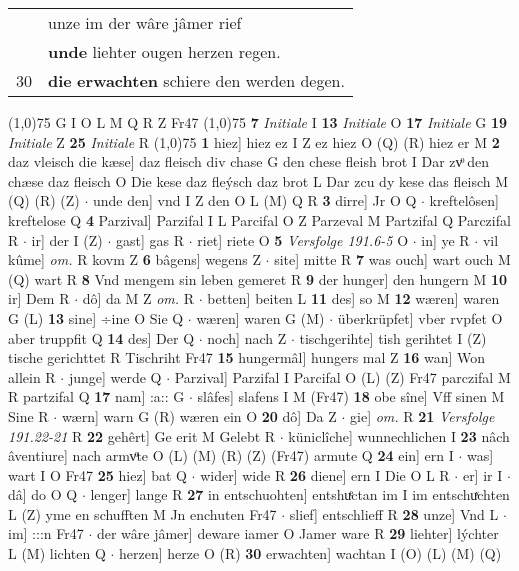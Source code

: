 \documentclass[8pt,a4paper,notitlepage]{article}
\begin{document}
\begin{table}[ht]
\begin{minipage}[t]{0.5\linewidth}
\begin{tabular}{rl}
 & unze im der wâre jâmer rief\\ 
 & \textbf{unde} liehter ougen herzen regen.\\ 
30 & \textbf{die} \textbf{erwachten} schiere den werden degen.\\ 
\end{tabular}
\scriptsize
\line(1,0){75} \newline
G I O L M Q R Z Fr47 \newline
\line(1,0){75} \newline
\textbf{7} \textit{Initiale} I  \textbf{13} \textit{Initiale} O  \textbf{17} \textit{Initiale} G  \textbf{19} \textit{Initiale} Z  \textbf{25} \textit{Initiale} R  \newline
\line(1,0){75} \newline
\textbf{1} hiez] hiez ez I Z ez hiez O (Q) (R) hiez er M \textbf{2} daz vleisch die kæse] daz fleisch div chase G den chese fleish brot I Dar zvͦ den chæse daz fleisch O Die kese daz fleýsch daz brot L Dar zcu dy kese das fleisch M (Q) (R) (Z)  $\cdot$ unde den] vnd I Z den O L (M) Q R \textbf{3} dirre] Jr O Q  $\cdot$ kreftelôsen] kreftelose Q \textbf{4} Parzival] Parzifal I L Parcifal O Z Parzeval M Partzifal Q Parczifal R  $\cdot$ ir] der I (Z)  $\cdot$ gast] gas R  $\cdot$ riet] riete O \textbf{5} \textit{Versfolge 191.6-5} O   $\cdot$ in] ye R  $\cdot$ vil kûme] \textit{om.} R kovm Z \textbf{6} bâgens] wegens Z  $\cdot$ site] mitte R \textbf{7} was ouch] wart ouch M (Q) wart R \textbf{8} Vnd mengem sin leben gemeret R \textbf{9} der hunger] den hungern M \textbf{10} ir] Dem R  $\cdot$ dô] da M Z \textit{om.} R  $\cdot$ betten] beiten L \textbf{11} des] so M \textbf{12} wæren] waren G (L) \textbf{13} sine] ÷ine O Sie Q  $\cdot$ wæren] waren G (M)  $\cdot$ überkrüpfet] vber rvpfet O aber truppfit Q \textbf{14} des] Der Q  $\cdot$ noch] nach Z  $\cdot$ tischgerihte] tish gerihtet I (Z) tische gerichttet R Tischriht Fr47 \textbf{15} hungermâl] hungers mal Z \textbf{16} wan] Won allein R  $\cdot$ junge] werde Q  $\cdot$ Parzival] Parzifal I Parcifal O (L) (Z) Fr47 parczifal M R partzifal Q \textbf{17} nam] :a:: G  $\cdot$ slâfes] slafens I M (Fr47) \textbf{18} obe sîne] Vff sinen M Sine R  $\cdot$ wærn] warn G (R) wæren ein O \textbf{20} dô] Da Z  $\cdot$ gie] \textit{om.} R \textbf{21} \textit{Versfolge 191.22-21} R  \textbf{22} gehêrt] Ge erit M Gelebt R  $\cdot$ küniclîche] wunnechlichen I \textbf{23} nâch âventiure] nach armvͦte O (L) (M) (R) (Z) (Fr47) armute Q \textbf{24} ein] ern I  $\cdot$ was] wart I O Fr47 \textbf{25} hiez] bat Q  $\cdot$ wider] wide R \textbf{26} diene] ern I Die O L R  $\cdot$ er] ir I  $\cdot$ dâ] do O Q  $\cdot$ lenger] lange R \textbf{27} in entschuohten] entshuͤctan im I im entschuͯchten L (Z) yme en schufften M Jn enchuten Fr47  $\cdot$ slief] entschlieff R \textbf{28} unze] Vnd L  $\cdot$ im] :::n Fr47  $\cdot$ der wâre jâmer] deware iamer O Jamer ware R \textbf{29} liehter] lýchter L (M) lichten Q  $\cdot$ herzen] herze O (R) \textbf{30} erwachten] wachtan I (O) (L) (M) (Q) \newline

\end{minipage}
\end{table}
\end{document}
